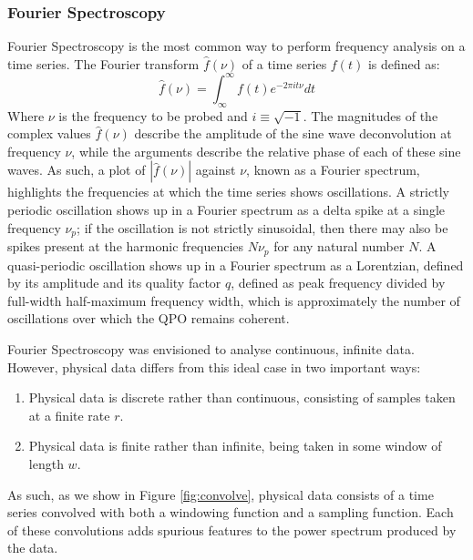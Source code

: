 \subsubsection{Fourier Spectroscopy}

\par Fourier Spectroscopy \citep{Fourier} is the most common way to perform frequency analysis on a time series.  The Fourier transform $\hat{f}(\nu)$ of a time series $f(t)$ is defined as:
\begin{equation}
\hat{f}(\nu)=\int_\infty^\infty f(t)e^{-2\pi it\nu} dt
\end{equation}
Where $\nu$ is the frequency to be probed and $i\equiv\sqrt{-1}$.  The magnitudes of the complex values $\hat{f}(\nu)$ describe the amplitude of the sine wave deconvolution at frequency $\nu$, while the arguments describe the relative phase of each of these sine waves.  As such, a plot of $|\hat{f}(\nu)|$ against $\nu$, known as a Fourier spectrum, highlights the frequencies at which the time series shows oscillations.  A strictly periodic oscillation shows up in a Fourier spectrum as a delta spike at a single frequency $\nu_p$; if the oscillation is not strictly sinusoidal, then there may also be spikes present at the harmonic frequencies $N\nu_p$ for any natural number $N$.  A quasi-periodic oscillation shows up in a Fourier spectrum as a Lorentzian, defined by its amplitude and its quality factor $q$, defined as peak frequency divided by full-width half-maximum frequency width, which is approximately the number of oscillations over which the QPO remains coherent.
\par Fourier Spectroscopy was envisioned to analyse continuous, infinite data.  However, physical data differs from this ideal case in two important ways:
\begin{enumerate}
\item Physical data is discrete rather than continuous, consisting of samples taken at a finite rate $r$.
\item Physical data is finite rather than infinite, being taken in some window of length $w$.
\end{enumerate}
As such, as we show in Figure \ref{fig:convolve}, physical data consists of a time series convolved with both a windowing function and a sampling function.  Each of these convolutions adds spurious features to the power spectrum produced by the data.


